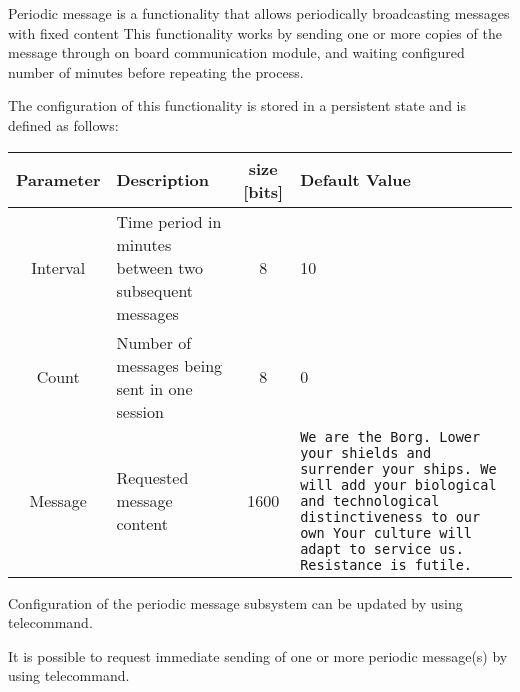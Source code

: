 
Periodic message is a functionality that allows periodically broadcasting messages with fixed content
This functionality works by sending one or more copies of the message through on board communication module,
 and waiting configured number of minutes before repeating the process. 

The configuration of this functionality is stored in a persistent state and is defined as follows:
\begin{center}
\begin{tabular}{c | m{4.5cm} | c | m{9cm}}
    \textbf{Parameter} & \textbf{Description} & \textbf{size [bits]} & \textbf{Default Value} \\
    \hline \hline
    Interval & Time period in minutes between two subsequent messages & 8 & 10 \\
    \hline
    Count & Number of messages being sent in one session & 8 & 0 \\
    \hline
    Message & Requested message content & 1600 & 
    \texttt{We are the Borg. Lower your shields and surrender your ships. We will add your biological and technological distinctiveness to our own Your culture will adapt to service us. Resistance is futile.} \\
    \hline
\end{tabular}
\end{center}

Configuration of the periodic message subsystem can be updated by using  telecommand.


It is possible to request immediate sending of one or more periodic message(s) by using  telecommand. 


